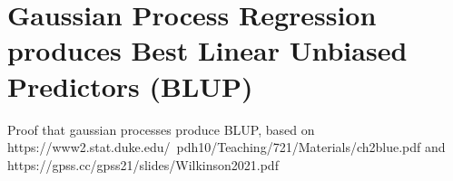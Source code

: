 \section{Gaussian Process Regression produces Best Linear Unbiased Predictors (BLUP)}
\label{app:blup}

Proof that gaussian processes produce BLUP, based on https://www2.stat.duke.edu/~pdh10/Teaching/721/Materials/ch2blue.pdf and https://gpss.cc/gpss21/slides/Wilkinson2021.pdf